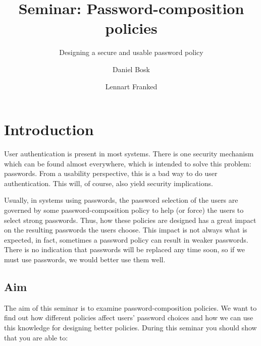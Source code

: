 \title{Seminar: Password-composition policies}
\subtitle{Designing a secure and usable password policy}

\author{%
  Daniel Bosk
  \and
  Lennart Franked
}

\maketitle

\begin{abstract}
  
\end{abstract}


\section{Introduction}%
\label{sec:intro}

User authentication is present in most systems.
There is one security mechanism which can be found almost everywhere, which is 
intended to solve this problem: passwords.
From a usability perspective, this is a bad way to do user authentication.
This will, of course, also yield security implications.

Usually, in systems using passwords, the password selection of the users are 
governed by some password-composition policy to help (or force) the users to 
select strong passwords.
Thus, how these policies are designed has a great impact on the resulting 
passwords the users choose.
This impact is not always what is expected, in fact, sometimes a password 
policy can result in weaker passwords.
There is no indication that passwords will be replaced any time soon, so if we 
must use passwords, we would better use them well.

\subsection{Aim}%
\label{sec:Syfte}

The aim of this seminar is to examine password-composition policies.
We want to find out how different policies affect users' password choices and 
how we can use this knowledge for designing better policies.
During this seminar you should show that you are able to:
\begin{itemize}
	
\end{itemize}

